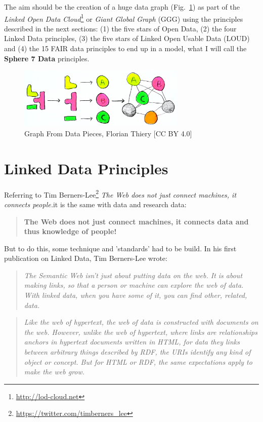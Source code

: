 \documentclass[twocolumn]{autart}
\begin{document}
The aim should be the creation of a huge data graph (Fig.~\ref{graph}) as part of the \textit{Linked Open Data Cloud}\footnote{\url{http://lod-cloud.net}} or \textit{Giant Global Graph} (GGG) using the principles described in the next sections: (1) the five stars of Open Data, (2) the four Linked Data principles, (3) the five stars of Linked Open Usable Data (LOUD) and (4) the 15 FAIR data principles to end up in a model, what I will call the \textbf{Sphere 7 Data} principles.

\begin{figure}[!htb]
\begin{center}
\includegraphics[width=8cm]{Graph_From_Data_Pieces.png}
\caption{Graph From Data Pieces, Florian Thiery [CC BY 4.0]}
\label{graph}
\end{center}
\end{figure}

\section{Linked Data Principles}

Referring to Tim Berners-Lee\footnote{\url{https://twitter.com/timberners_lee}} \frqq\textit{The Web does not just connect machines, it connects people.}\flqq it is the same with data and research data:

\begin{verse}
	\textbf{The Web does not just connect machines, it connects data and thus knowledge of people!}
\end{verse}

But to do this, some technique and 'standards' had to be build. In his first publication on Linked Data, Tim Berners-Lee wrote:

\begin{quotation}
	\frqq\textit{The Semantic Web isn't just about putting data on the web. It is about making links, so that a person or machine can explore the web of data. With linked data, when you have some of it, you can find other, related, data.}\flqq\cite{berners-lee_linked_2006}
\end{quotation}

\begin{quotation}
	\frqq\textit{Like the web of hypertext, the web of data is constructed with documents on the web. However, unlike the web of hypertext, where links are relationships anchors in hypertext documents written in HTML, for data they links between arbitrary things described by RDF, the URIs identify any kind of object or concept. But for HTML or RDF, the same expectations apply to make the web grow.}\flqq\cite{berners-lee_linked_2006}
\end{quotation}
\end{document}
